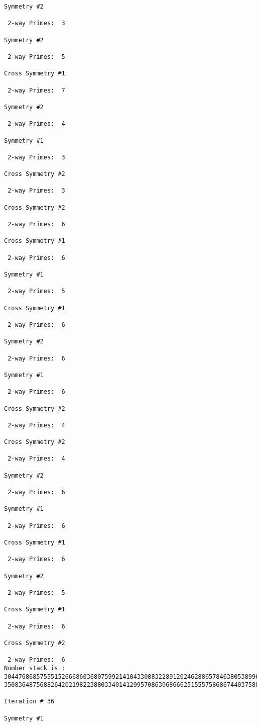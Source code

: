 {{{{\begin{verbatim}
Symmetry #2

 2-way Primes: 	3

Symmetry #2

 2-way Primes: 	5

Cross Symmetry #1

 2-way Primes: 	7

Symmetry #2

 2-way Primes: 	4

Symmetry #1

 2-way Primes: 	3

Cross Symmetry #2

 2-way Primes: 	3

Cross Symmetry #2

 2-way Primes: 	6

Cross Symmetry #1

 2-way Primes: 	6

Symmetry #1

 2-way Primes: 	5

Cross Symmetry #1

 2-way Primes: 	6

Symmetry #2

 2-way Primes: 	6

Symmetry #1

 2-way Primes: 	6

Cross Symmetry #2

 2-way Primes: 	4

Cross Symmetry #2

 2-way Primes: 	4

Symmetry #2

 2-way Primes: 	6

Symmetry #1

 2-way Primes: 	6

Cross Symmetry #1

 2-way Primes: 	6

Symmetry #2

 2-way Primes: 	5

Cross Symmetry #1

 2-way Primes: 	6

Cross Symmetry #2

 2-way Primes: 	6
Number stack is :
30447686857555152666860368075992141043308832289120246288657846380538996794608835958544046240163340857
35083648756882642021982238803340141299570863068666251555758686744037580433610426404458595388064976998

Iteration #	36

Symmetry #1


\end{verbatim}}}}}
